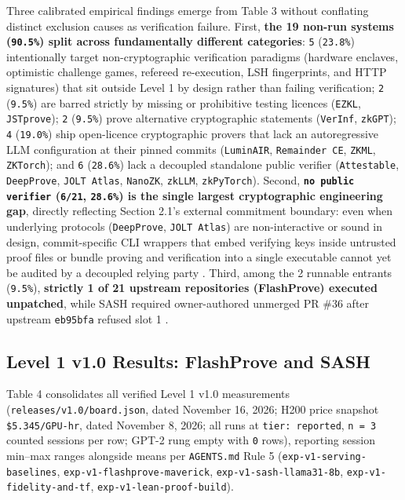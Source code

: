 \documentclass[11pt,letterpaper]{article}
\begin{document}
Three calibrated empirical findings emerge from Table 3 without conflating distinct exclusion causes as verification failure. First, \textbf{the 19 non-run systems (\texttt{90.5\%}) split across fundamentally different categories}: \texttt{5} (\texttt{23.8\%}) intentionally target non-cryptographic verification paradigms (hardware enclaves, optimistic challenge games, refereed re-execution, LSH fingerprints, and HTTP signatures) that sit outside Level 1 by design rather than failing verification; \texttt{2} (\texttt{9.5\%}) are barred strictly by missing or prohibitive testing licences (\texttt{EZKL}, \texttt{JSTprove}); \texttt{2} (\texttt{9.5\%}) prove alternative cryptographic statements (\texttt{VerInf}, \texttt{zkGPT}); \texttt{4} (\texttt{19.0\%}) ship open-licence cryptographic provers that lack an autoregressive LLM configuration at their pinned commits (\texttt{LuminAIR}, \texttt{Remainder CE}, \texttt{ZKML}, \texttt{ZKTorch}); and \texttt{6} (\texttt{28.6\%}) lack a decoupled standalone public verifier (\texttt{Attestable}, \texttt{DeepProve}, \texttt{JOLT Atlas}, \texttt{NanoZK}, \texttt{zkLLM}, \texttt{zkPyTorch}). Second, \textbf{\texttt{no public verifier} (\texttt{6/\allowbreak{}21}, \texttt{28.6\%}) is the single largest cryptographic engineering gap}, directly reflecting Section 2.1's external commitment boundary: even when underlying protocols (\texttt{DeepProve}, \texttt{JOLT Atlas}) are non-interactive or sound in design, commit-specific CLI wrappers that embed verifying keys inside untrusted proof files or bundle proving and verification into a single executable cannot yet be audited by a decoupled relying party \cite{iproofs2026}. Third, among the 2 runnable entrants (\texttt{9.5\%}), \textbf{strictly 1 of 21 upstream repositories (FlashProve) executed unpatched}, while SASH required owner-authored unmerged PR \#36 after upstream \texttt{eb95bfa} refused slot 1 \cite{iproofs2026}.

\subsection{Level 1 v1.0 Results: FlashProve and SASH}

Table 4 consolidates all verified Level 1 v1.0 measurements (\texttt{releases/\allowbreak{}v1.0/\allowbreak{}board.\allowbreak{}json}, dated November 16, 2026; H200 price snapshot \texttt{\$5.345/\allowbreak{}GPU-\allowbreak{}hr}, dated November 8, 2026; all runs at \texttt{tier: reported}, \texttt{n = 3} counted sessions per row; GPT-2 rung empty with \texttt{0} rows), reporting session min--max ranges alongside means per \texttt{AGENTS.\allowbreak{}md} Rule 5 \cite{iproofs2026} (\texttt{exp-\allowbreak{}v1-\allowbreak{}serving-\allowbreak{}baselines}, \texttt{exp-\allowbreak{}v1-\allowbreak{}flashprove-\allowbreak{}maverick}, \texttt{exp-\allowbreak{}v1-\allowbreak{}sash-\allowbreak{}llama31-8b}, \texttt{exp-\allowbreak{}v1-\allowbreak{}fidelity-\allowbreak{}and-\allowbreak{}tf}, \texttt{exp-\allowbreak{}v1-\allowbreak{}lean-\allowbreak{}proof-\allowbreak{}build}).
\end{document}
